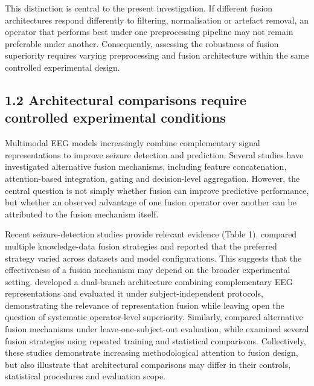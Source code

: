 \documentclass[11pt,a4paper]{article}
\begin{document}
This distinction is central to the present investigation. If different fusion
architectures respond differently to filtering, normalisation or artefact removal, an
operator that performs best under one preprocessing pipeline may not remain preferable
under another. Consequently, assessing the robustness of fusion superiority requires
varying preprocessing and fusion architecture within the same controlled experimental
design.

\subsection{1.2 Architectural comparisons require controlled experimental conditions}\label{architectural-comparisons-require-controlled-experimental-conditions}

Multimodal EEG models increasingly combine complementary signal representations to improve
seizure detection and prediction. Several studies have investigated alternative fusion
mechanisms, including feature concatenation, attention-based integration, gating and
decision-level aggregation. However, the central question is not simply whether fusion can
improve predictive performance, but whether an observed advantage of one fusion operator
over another can be attributed to the fusion mechanism itself.

Recent seizure-detection studies provide relevant evidence (Table 1). \citet{An_2026}
compared multiple knowledge-data fusion strategies and reported that the preferred
strategy varied across datasets and model configurations. This suggests that the
effectiveness of a fusion mechanism may depend on the broader experimental setting. \citet{Tiwary_2026} developed a dual-branch architecture combining complementary EEG
representations and evaluated it under subject-independent protocols, demonstrating the
relevance of representation fusion while leaving open the question of systematic
operator-level superiority. Similarly, \citet{Einizade_2023} compared alternative fusion
mechanisms under leave-one-subject-out evaluation, while \citet{Basheer_2026}
examined several fusion strategies using repeated training and statistical comparisons.
Collectively, these studies demonstrate increasing methodological attention to fusion
design, but also illustrate that architectural comparisons may differ in their controls,
statistical procedures and evaluation scope.
\end{document}
